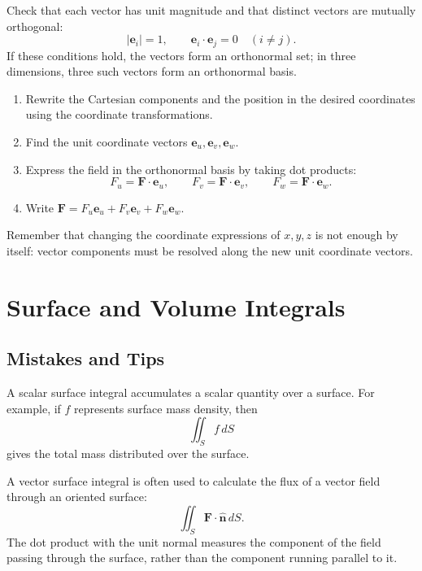 \begin{nmeth}
  Check that each vector has unit magnitude and that distinct vectors are mutually orthogonal:
  \[
    |\mathbf{e}_i|=1,\qquad
    \mathbf{e}_i\cdot\mathbf{e}_j=0\quad(i\ne j).
  \]
  If these conditions hold, the vectors form an orthonormal set; in three dimensions, three such vectors form an orthonormal basis.
\end{nmeth}

\begin{nmeth}
  \begin{enumerate} \emph{}
    \item Rewrite the Cartesian components and the position in the desired coordinates using the coordinate transformations.
    \item Find the unit coordinate vectors $\mathbf{e}_u,\mathbf{e}_v,\mathbf{e}_w$.
    \item Express the field in the orthonormal basis by taking dot products:
    \[
      F_u=\mathbf{F}\cdot\mathbf{e}_u,\qquad
      F_v=\mathbf{F}\cdot\mathbf{e}_v,\qquad
      F_w=\mathbf{F}\cdot\mathbf{e}_w.
    \]
    \item Write $\mathbf{F}=F_u\mathbf{e}_u+F_v\mathbf{e}_v+F_w\mathbf{e}_w$.
  \end{enumerate}
  Remember that changing the coordinate expressions of $x,y,z$ is not enough by itself: vector components must be resolved along the new unit coordinate vectors.
\end{nmeth}

\section{Surface and Volume Integrals}

\subsection{Mistakes and Tips}

\begin{blackbox}
  A scalar surface integral accumulates a scalar quantity over a surface. For example, if $f$ represents surface mass density, then
  \[
    \iint_S f\,dS
  \]
  gives the total mass distributed over the surface.

  A vector surface integral is often used to calculate the flux of a vector field through an oriented surface:
  \[
    \iint_S \mathbf{F}\cdot\hat{\mathbf{n}}\,dS.
  \]
  The dot product with the unit normal measures the component of the field passing through the surface, rather than the component running parallel to it.
\end{blackbox}


